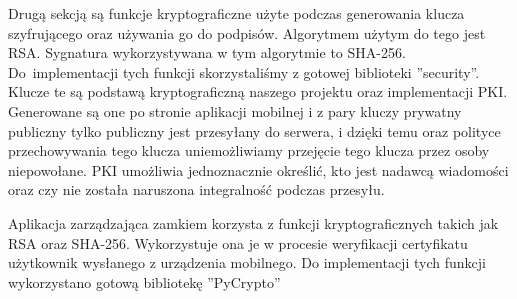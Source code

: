 Drugą sekcją są funkcje kryptograficzne użyte podczas generowania klucza szyfrującego oraz używania go do podpisów. Algorytmem użytym do tego jest RSA. Sygnatura wykorzystywana w tym algorytmie to SHA-256. Do~implementacji tych funkcji skorzystaliśmy z gotowej biblioteki ''security''. Klucze te są podstawą kryptograficzną naszego projektu oraz implementacji PKI. Generowane są one po stronie aplikacji mobilnej i z pary kluczy prywatny publiczny tylko publiczny jest przesyłany do serwera, i dzięki temu oraz polityce przechowywania tego klucza uniemożliwiamy przejęcie tego klucza przez osoby niepowołane. PKI umożliwia jednoznacznie określić, kto jest nadawcą wiadomości oraz czy nie została naruszona integralność podczas przesyłu.

Aplikacja zarządzająca zamkiem korzysta z funkcji kryptograficznych takich jak RSA oraz SHA-256. Wykorzystuje ona je w procesie weryfikacji certyfikatu użytkownik wysłanego z urządzenia mobilnego. Do implementacji tych funkcji wykorzystano gotową bibliotekę ''PyCrypto''

\newpage
